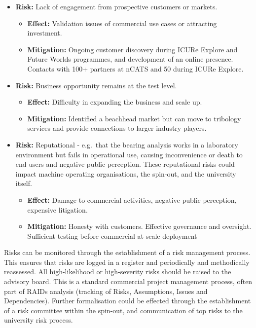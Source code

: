 \documentclass[runningheads]{llncs}
\begin{document}
\begin{itemize}
        \begin{itemize}
            \item \textbf{Effect:} Lack of product development and sales.
            \item \textbf{Mitigation:} Commercial partnerships and ongoing validation of commercial feasibility.
            \item \textbf{Mitigation:} 3 partners, increasing the likelihood of successful integration with at least one, but also explore other systems with new partners.
        \end{itemize}
        \item \textbf{Risk:} Lack of engagement from prospective customers or markets.
        \begin{itemize}
            \item \textbf{Effect:} Validation issues of commercial use cases or attracting investment.
            \item \textbf{Mitigation:} Ongoing customer discovery during ICURe Explore and Future Worlds programmes, and development of an online presence. Contacts with 100+ partners at nCATS and 50 during ICURe Explore.
        \end{itemize}
        \item \textbf{Risk:} Business opportunity remains at the test level.
        \begin{itemize}
            \item \textbf{Effect:} Difficulty in expanding the business and scale up.
            \item \textbf{Mitigation:} Identified a beachhead market but can move to tribology services and provide connections to larger industry players.
        \end{itemize}
        \item \textbf{Risk:} Reputational - e.g.\ that the bearing analysis works in a laboratory environment but fails in operational use, causing inconvenience or death to end-users and negative public perception. These reputational risks could impact machine operating organisations, the spin-out, and the university itself. 
        \begin{itemize}
            \item \textbf{Effect:} Damage to commercial activities, negative public perception, expensive litigation.
            \item \textbf{Mitigation:} Honesty with customers. Effective governance and oversight. Sufficient testing before commercial at-scale deployment
        \end{itemize} 
    \end{itemize}
    Risks can be monitored through the establishment of a risk management process. This ensures that risks are logged in a register and periodically and methodically reassessed. All high-likelihood or high-severity risks should be raised to the advisory board. This is a standard commercial project management process, often part of RAIDs analysis (tracking of Risks, Assumptions, Issues and Dependencies). Further formalisation could be effected through the establishment of a risk committee within the spin-out, and communication of top risks to the university risk process. 
    
\end{document}
